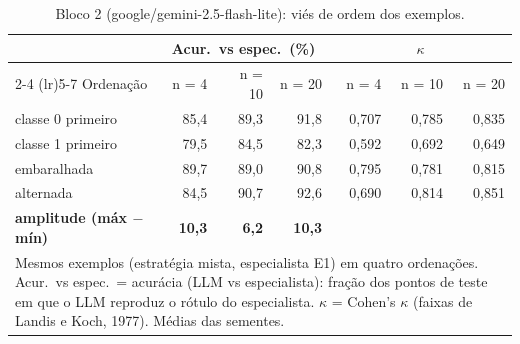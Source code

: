 \begin{table}[htbp]
\centering
\small
\caption{Bloco 2 (google/gemini-2.5-flash-lite): viés de ordem dos exemplos.}
\label{tab:bloco2_E1_ordem_exemplos_flashlite}
\begin{tabular}{lrrrrrr}
\toprule
 & \multicolumn{3}{c}{Acur.\ vs espec.\ (\%)} & \multicolumn{3}{c}{$\kappa$} \\ \cmidrule(lr){2-4} \cmidrule(lr){5-7}
Ordenação & n = 4 & n = 10 & n = 20 & n = 4 & n = 10 & n = 20 \\
\midrule
classe 0 primeiro & 85,4 & 89,3 & 91,8 & 0,707 & 0,785 & 0,835 \\
classe 1 primeiro & 79,5 & 84,5 & 82,3 & 0,592 & 0,692 & 0,649 \\
embaralhada & 89,7 & 89,0 & 90,8 & 0,795 & 0,781 & 0,815 \\
alternada & 84,5 & 90,7 & 92,6 & 0,690 & 0,814 & 0,851 \\
\midrule
\textbf{amplitude (máx $-$ mín)} & \textbf{10,3} & \textbf{6,2} & \textbf{10,3} &  &  &  \\
\bottomrule
\multicolumn{7}{p{0.95\linewidth}}{\footnotesize Mesmos exemplos (estratégia mista, especialista E1) em quatro ordenações. Acur.\ vs espec.\ = acurácia (LLM vs especialista): fração dos pontos de teste em que o LLM reproduz o rótulo do especialista. $\kappa$ = Cohen's $\kappa$ (faixas de Landis e Koch, 1977). Médias das sementes.} \\
\end{tabular}
\end{table}
